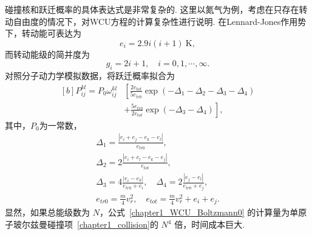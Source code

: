 碰撞核和跃迁概率的具体表达式是非常复杂的. 这里以氮气为例，考虑在只存在转动自由度的情况下，对WCU方程的计算复杂性进行说明. 在Lennard-Jones作用势下，转动能可表达为
\begin{equation*}
e_{i}=2.9i(i+1)~\text{K},
\end{equation*}
而转动能级的简并度为
\begin{equation*}
g_i=2i+1, \quad
i=0,1,\cdots,\infty.
\end{equation*}
对照分子动力学模拟数据\cite{Beylich2000,Tcheremissine2008AIP}，将跃迁概率拟合为
\begin{equation*}
\begin{aligned}[b]
P_{ij}^{kl}=P_0\omega_{ij}^{kl}&\left[\frac{2e_{tot}}{5e_{tr0}}\exp(-\Delta_1-\Delta_2-\Delta_3-\Delta_4)\right.\\
&+\left.\frac{5e_{tr0}}{2e_{tot}}\exp(-\Delta_3-\Delta_4)\right],
\end{aligned}
\end{equation*}
其中，$P_0$为一常数，
\begin{equation*}
\begin{aligned}
\Delta_1=\frac{|e_{i}+e_{j}-e_{k}-e_{l}|}{e_{tr0}}, \\
\Delta_2=2\frac{|e_{i}+e_{l}-e_{k}-e_{j}|}{e_{tot}},\\
\Delta_3=4\frac{|e_{i}-e_{k}|}{e_{tr0}+e_{i}}, \quad 
\Delta_4=2\frac{|e_{j}-e_{l}|}{e_{tr0}+e_{j}},\\
e_{tr0}=\frac{m}{4}v_r^2, \quad
e_{tot}=\frac{m}{4}v_r^2+e_{i}+e_{j}.
\end{aligned}
\end{equation*}
显然，如果总能级数为 $N$，公式~\eqref{chapter1_WCU_Boltzmann0} 的计算量为单原子玻尔兹曼碰撞项~\eqref{chapter1_collision}的 $N^4$ 倍，时间成本巨大. 



